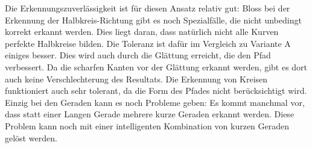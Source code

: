 Die Erkennungszuverlässigkeit ist für diesen Ansatz relativ gut: Bloss bei der Erkennung der Halbkreis-Richtung gibt es noch Spezialfälle, die nicht unbedingt korrekt erkannt werden. Dies liegt daran, dass natürlich nicht alle Kurven perfekte Halbkreise bilden. Die Toleranz ist dafür im Vergleich zu Variante A einiges besser. Dies wird auch durch die Glättung erreicht, die den Pfad verbessert. Da die scharfen Kanten vor der Glättung erkannt werden, gibt es dort auch keine Verschlechterung des Resultats. Die Erkennung von Kreisen funktioniert auch sehr tolerant, da die Form des Pfades nicht berücksichtigt wird. Einzig bei den Geraden kann es noch Probleme geben: Es kommt manchmal vor, dass statt einer Langen Gerade mehrere kurze Geraden erkannt werden. Diese Problem kann noch mit einer intelligenten Kombination von kurzen Geraden gelöst werden.